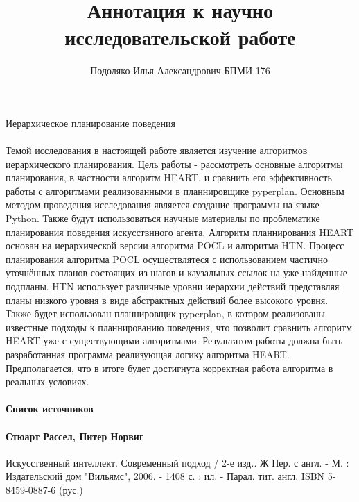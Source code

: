 \documentclass{article}
\title{Аннотация к научно исследовательской работе}
\author{Подоляко Илья Александрович БПМИ-176}
\date{}
\begin{document}
\maketitle

\begin{center}
Иерархическое планирование поведения
\end{center}

\paragraph{}

Темой исследования в настоящей работе является изучение алгоритмов иерархического планирования. \newline
Цель работы - рассмотреть основные алгоритмы планирования, в частности алгоритм HEART, и сравнить его эффективность работы с алгоритмами реализованными в планнировщике pyperplan. \newline
Основным методом проведения исследования является создание программы на языке Python. Также будут использоваться научные материалы по проблематике планирования поведения искусствнного агента. Алгоритм планнирования HEART основан на иерархической версии алгоритма POCL и алгоритма HTN. Процесс планирования алгоритма POCL осуществлятеся с использованием частично уточнённых планов состоящих из шагов и каузальных ссылок на уже найденные подпланы. HTN использует различные уровни иерархии действий представляя планы низкого уровня в виде абстрактных действий более высокого уровня.
 Также будет использован планнировщик pyperplan, в котором реализованы известные подходы к планнированию поведения, что позволит сравнить алгоритм HEART уже с существующими алгоритмами.\newline
Результатом работы должна быть разработанная программа реализующая логику алгоритма HEART. \newline
Предполагается, что в итоге будет достигнута корректная работа алгоритма в реальных условиях. 

\newpage
\paragraph{Список источников}
\paragraph{Стюарт Рассел, Питер Норвиг}
Искусственный интеллект. Современный подход / 2-е изд.. Ж Пер. с англ. - М. : Издательский дом "Вильямс", 2006. -  1408 с. : ил. - Парал. тит. англ. ISBN 5-8459-0887-6 (рус.) \newline
\end{document}
